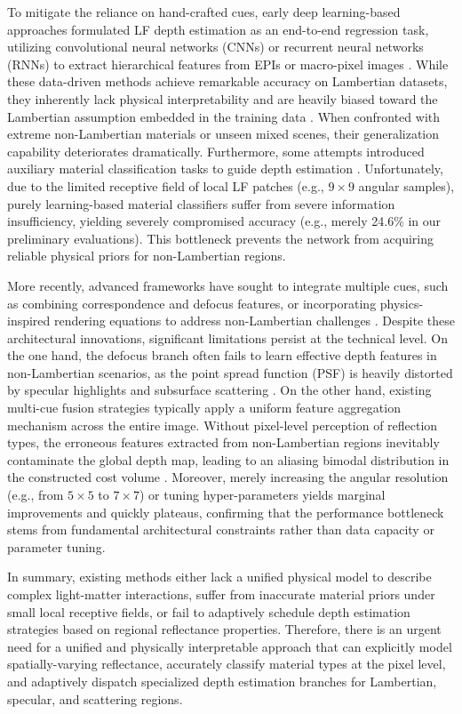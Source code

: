 To mitigate the reliance on hand-crafted cues, early deep learning-based approaches formulated LF depth estimation as an end-to-end regression task, utilizing convolutional neural networks (CNNs) or recurrent neural networks (RNNs) to extract hierarchical features from EPIs or macro-pixel images . While these data-driven methods achieve remarkable accuracy on Lambertian datasets, they inherently lack physical interpretability and are heavily biased toward the Lambertian assumption embedded in the training data . When confronted with extreme non-Lambertian materials or unseen mixed scenes, their generalization capability deteriorates dramatically. Furthermore, some attempts introduced auxiliary material classification tasks to guide depth estimation . Unfortunately, due to the limited receptive field of local LF patches (e.g., \(9 \times 9\) angular samples), purely learning-based material classifiers suffer from severe information insufficiency, yielding severely compromised accuracy (e.g., merely 24.6\% in our preliminary evaluations). This bottleneck prevents the network from acquiring reliable physical priors for non-Lambertian regions.

More recently, advanced frameworks have sought to integrate multiple cues, such as combining correspondence and defocus features, or incorporating physics-inspired rendering equations to address non-Lambertian challenges . Despite these architectural innovations, significant limitations persist at the technical level. On the one hand, the defocus branch often fails to learn effective depth features in non-Lambertian scenarios, as the point spread function (PSF) is heavily distorted by specular highlights and subsurface scattering . On the other hand, existing multi-cue fusion strategies typically apply a uniform feature aggregation mechanism across the entire image. Without pixel-level perception of reflection types, the erroneous features extracted from non-Lambertian regions inevitably contaminate the global depth map, leading to an aliasing bimodal distribution in the constructed cost volume . Moreover, merely increasing the angular resolution (e.g., from \(5 \times 5\) to \(7 \times 7\)) or tuning hyper-parameters yields marginal improvements and quickly plateaus, confirming that the performance bottleneck stems from fundamental architectural constraints rather than data capacity or parameter tuning.

In summary, existing methods either lack a unified physical model to describe complex light-matter interactions, suffer from inaccurate material priors under small local receptive fields, or fail to adaptively schedule depth estimation strategies based on regional reflectance properties. Therefore, there is an urgent need for a unified and physically interpretable approach that can explicitly model spatially-varying reflectance, accurately classify material types at the pixel level, and adaptively dispatch specialized depth estimation branches for Lambertian, specular, and scattering regions.

